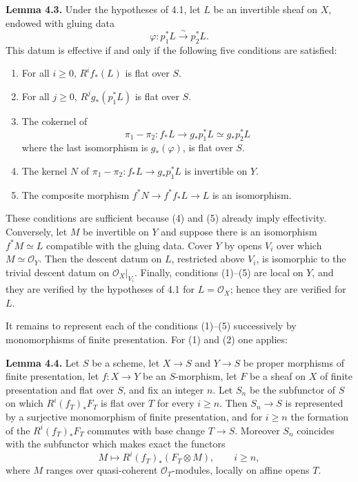 \documentclass[11pt]{article}
\begin{document}
\textbf{Lemma 4.3.} Under the hypotheses of 4.1, let \(L\) be an invertible sheaf on \(X\), endowed with gluing data
\[
  \varphi:p_1^*L\xrightarrow{\sim}p_2^*L.
\]
This datum is effective if and only if the following five conditions are satisfied:
\begin{enumerate}[label=\arabic*)]
\item For all \(i\ge0\), \(R^if_*(L)\) is flat over \(S\).
\item For all \(j\ge0\), \(R^jg_*(p_1^*L)\) is flat over \(S\).
\item The cokernel of
\[
  \pi_1-\pi_2:f_*L\longrightarrow g_*p_1^*L\simeq g_*p_2^*L
\]
where the last isomorphism is \(g_*(\varphi)\), is flat over \(S\).
\item The kernel \(N\) of \(\pi_1-\pi_2:f_*L\to g_*p_1^*L\) is invertible on \(Y\).
\item The composite morphism \(f^*N\to f^*f_*L\to L\) is an isomorphism.
\end{enumerate}
These conditions are sufficient because (4) and (5) already imply effectivity. Conversely, let \(M\) be invertible on \(Y\) and suppose there is an isomorphism \(f^*M\simeq L\) compatible with the gluing data. Cover \(Y\) by opens \(V_i\) over which \(M\simeq\mathcal O_Y\). Then the descent datum on \(L\), restricted above \(V_i\), is isomorphic to the trivial descent datum on \(\mathcal O_X|_{V_i}\). Finally, conditions (1)--(5) are local on \(Y\), and they are verified by the hypotheses of 4.1 for \(L=\mathcal O_X\); hence they are verified for \(L\).

It remains to represent each of the conditions (1)--(5) successively by monomorphisms of finite presentation. For (1) and (2) one applies:

\textbf{Lemma 4.4.} Let \(S\) be a scheme, let \(X\to S\) and \(Y\to S\) be proper morphisms of finite presentation, let \(f:X\to Y\) be an \(S\)-morphism, let \(F\) be a sheaf on \(X\) of finite presentation and flat over \(S\), and fix an integer \(n\). Let \(S_n\) be the subfunctor of \(S\) on which \(R^i(f_T)_*F_T\) is flat over \(T\) for every \(i\ge n\). Then \(S_n\to S\) is represented by a surjective monomorphism of finite presentation, and for \(i\ge n\) the formation of the \(R^i(f_T)_*F_T\) commutes with base change \(T\to S\). Moreover \(S_n\) coincides with the subfunctor which makes exact the functors
\[
  M\longmapsto R^i(f_T)_*(F_T\otimes M),\qquad i\ge n,
\]
where \(M\) ranges over quasi-coherent \(\mathcal O_T\)-modules, locally on affine opens \(T\).
\end{document}
